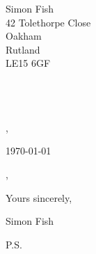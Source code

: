 \documentclass{article}
\def \recipname {}
\def \recipgreeting {}
\def \recipaddresslineone {}
\def \recipaddresslinetwo {}
\def \reciptown {}
\def \recipcounty {}
\def \recippostcode {}
\begin{document}
\setlength{\parindent}{0em}
\begin{flushright}
	Simon Fish\\
	42 Tolethorpe Close\\
	Oakham\\
	Rutland\\
	LE15 6GF\\
\end{flushright}

\recipname\\\recipaddresslineone\\\recipaddresslinetwo\\\reciptown, \recipcounty\\\recippostcode

\bigskip

\today
\bigskip

\recipgreeting,
\setlength{\parindent}{2em}
\setlength{\parskip}{0.5cm plus4mm minus3mm}
\bigskip


\bigskip

Yours sincerely,

\vspace{2\baselineskip}

Simon Fish

P.S. 
\end{document}
